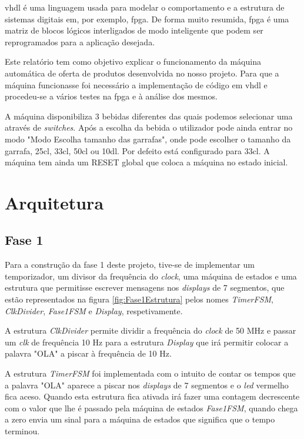 \documentclass{report}
\begin{document}
\ac{vhdl} é uma linguagem usada para modelar o comportamento e a estrutura de sistemas digitais em, por exemplo, \ac{fpga}. De forma muito resumida, \ac{fpga} é uma matriz de blocos lógicos interligados de modo inteligente que podem ser reprogramados para a aplicação desejada.

Este relatório tem como objetivo explicar o funcionamento da máquina automática de oferta de produtos desenvolvida no nosso projeto. Para que a máquina funcionasse foi necessário a implementação de código em \ac{vhdl} e procedeu-se a vários testes na \ac{fpga} e à análise dos mesmos.

A máquina disponibiliza 3 bebidas diferentes das quais podemos selecionar uma através de \textit{switches}. Após a escolha da bebida o utilizador pode ainda entrar no modo "Modo Escolha tamanho das garrafas", onde pode escolher o tamanho da garrafa, 25cl, 33cl, 50cl ou 10dl. Por defeito está configurado para 33cl. A máquina tem ainda um RESET global que coloca a máquina no estado inicial.

\chapter{Arquitetura}
\label{chap.arquitetura}
\section{Fase 1}
Para a construção da fase 1 deste projeto, tive-se de implementar um temporizador, um divisor da frequência do \textit{clock}, uma máquina de estados e uma estrutura que permitisse escrever mensagens nos \textit{displays} de 7 segmentos, que estão representados na figura \ref{fig:Fase1Estrutura} pelos nomes \textit{TimerFSM}, \textit{ClkDivider}, \textit{Fase1FSM} e \textit{Display}, respetivamente.

A estrutura \textit{ClkDivider} permite dividir a frequência do \textit{clock} de 50 MHz e passar um \textit{clk} de frequência 10 Hz para a estrutura \textit{Display} que irá permitir colocar a palavra "OLA" a piscar à frequência de 10 Hz.

A estrutura \textit{TimerFSM} foi implementada com o intuito de contar os tempos que a palavra "OLA" aparece a piscar nos \textit{displays} de 7 segmentos e o \textit{led} vermelho fica aceso. Quando esta estrutura fica ativada irá fazer uma contagem decrescente com o valor que lhe é passado pela máquina de estados \textit{Fase1FSM}, quando chega a zero envia um sinal para a máquina de estados que significa que o tempo terminou.
\end{document}
